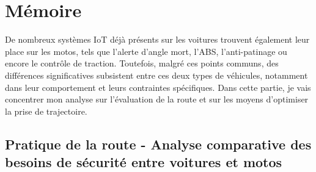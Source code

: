 \section{Mémoire}


De nombreux systèmes IoT déjà présents sur les voitures trouvent également leur place sur les motos, tels que l’alerte d’angle mort, l’ABS, l’anti-patinage ou encore le contrôle de traction. Toutefois, malgré ces points communs, des différences significatives subsistent entre ces deux types de véhicules, notamment dans leur comportement et leurs contraintes spécifiques. Dans cette partie, je vais concentrer mon analyse sur l’évaluation de la route et sur les moyens d’optimiser la prise de trajectoire.



\subsection{Pratique de la route - Analyse comparative des besoins de sécurité entre voitures et motos}



